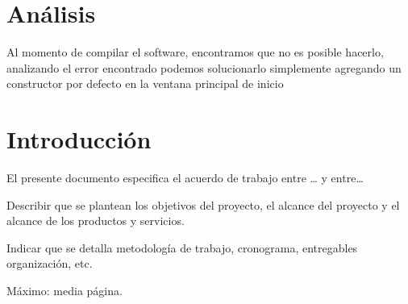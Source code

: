 \section{Análisis}
Al momento de compilar el software, encontramos que no es posible hacerlo, analizando el error encontrado podemos solucionarlo simplemente agregando un constructor por defecto en la ventana principal de inicio

\section{Introducción}
El presente documento especifica el acuerdo de trabajo entre … y entre…

Describir que se plantean los objetivos del proyecto, el alcance del proyecto y el alcance de los productos y servicios.

Indicar que se detalla metodología de trabajo, cronograma, entregables organización, etc.

Máximo: media página.


